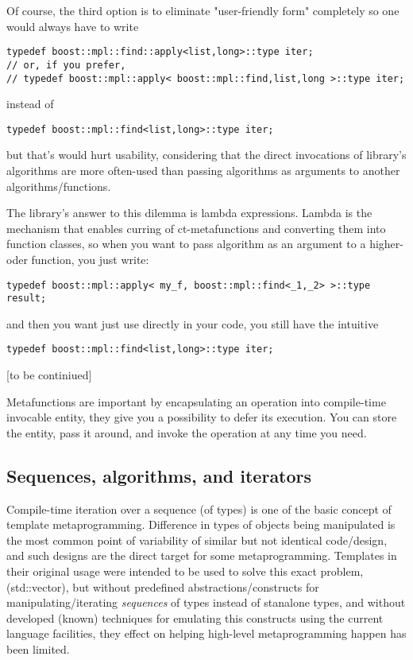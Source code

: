 \documentclass{netobjectdays}
\begin{document}
Of course, the third option is to eliminate 
"user-friendly form" completely so one would always 
have to write

{\footnotesize
\begin{verbatim}
typedef boost::mpl::find::apply<list,long>::type iter;
// or, if you prefer,
// typedef boost::mpl::apply< boost::mpl::find,list,long >::type iter;
\end{verbatim}
}

instead of 

{\footnotesize
\begin{verbatim}
typedef boost::mpl::find<list,long>::type iter;
\end{verbatim}
}

but that's would hurt usability, considering that the direct 
invocations of library's algorithms are more often-used than 
passing algorithms as arguments to another 
algorithms/functions. 

The library's answer to this dilemma is lambda expressions. 
Lambda is the mechanism that enables curring of 
ct-metafunctions and converting them into function classes, 
so when you want to pass  algorithm as an argument 
to a higher-oder function, you just write:

{\footnotesize
\begin{verbatim}
typedef boost::mpl::apply< my_f, boost::mpl::find<_1,_2> >::type result;
\end{verbatim}
}

and then you want just use  directly in your code, 
you still have the intuitive

{\footnotesize
\begin{verbatim}
typedef boost::mpl::find<list,long>::type iter;
\end{verbatim}
}


[to be continiued]


Metafunctions are important by encapsulating an operation into 
compile-time invocable entity, they give you a possibility to 
defer its execution. You can store the entity, pass it around, 
and invoke the operation at any time you need.

\subsection{Sequences, algorithms, and iterators}

Compile-time iteration over a sequence (of types) is one of 
the basic concept of template metaprogramming. Difference in 
types of objects being manipulated is the most common point 
of variability of similar but not identical code/design, and 
such designs are the direct target for some metaprogramming. 
Templates in their original usage were intended to be used to 
solve this exact problem, (std::vector), but without predefined 
abstractions/constructs for manipulating/iterating 
\emph{sequences} of types instead of stanalone types, and 
without developed (known) techniques for emulating this 
constructs using the current language facilities, they effect 
on helping high-level metaprogramming happen has been limited. 
\end{document}
